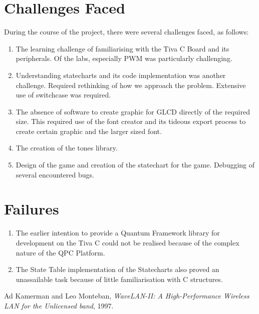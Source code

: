 \documentclass[a4paper,12pt,oneside]{book}
\begin{document}
\section{Challenges Faced}
\qquad During the course of the project, there were several challenges faced, as follows:
\begin{enumerate}
\item The learning challenge of familiarising with the Tiva C Board and its peripherals. Of the labs, especially PWM was particularly challenging.
\item Understanding statecharts and its code implementation was another challenge. Required rethinking of how we approach the problem. Extensive use of switchcase was required.
\item The absence of software to create graphic for GLCD directly of the required size. This required use of the font creator and its tideous export process to create certain graphic and the larger sized font.
\item The creation of the tones library.
\item Design of the game and creation of the statechart for the game. Debugging of several encountered bugs.
\end{enumerate}
\section{Failures}
\begin{enumerate}
\item The earlier intention to provide a Quantum Framework library for development on the Tiva C could not be realised because of the complex nature of the QPC Platform.
\item The State Table implementation of the Statecharts also proved an unassailable task because of little familiarisation with C structures.
\end{enumerate}
\begin{thebibliography}{li}
Ad Kamerman and Leo Monteban,
{\em WaveLAN-II: A High-Performance Wireless LAN for the Unlicensed band},
1997.

\end{thebibliography}
\end{document}
